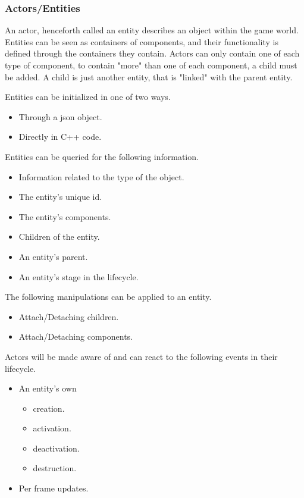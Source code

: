\subsubsection*{Actors/Entities}
An actor, henceforth called an entity describes an object within the game world. 
Entities can be seen as containers of components, 
and their functionality is defined through the containers they contain.
Actors can only contain one of each type of component, to contain "more" than one of each component, a child must be added. 
A child is just another entity, that is "linked" with the parent entity.

Entities can be initialized in one of two ways.
\begin{itemize}
    \item
    Through a json object.

    \item
    Directly in C++ code.
\end{itemize}

Entities can be queried for the following information.
\begin{itemize}
    \item
    Information related to the type of the object.

    \item
    The entity's unique id.

    \item
    The entity's components.

    \item
    Children of the entity.

    \item
    An entity's parent.

    \item
    An entity's stage in the lifecycle.
\end{itemize}

The following manipulations can be applied to an entity.
\begin{itemize}
    \item 
    Attach/Detaching children.

    \item
    Attach/Detaching components.
\end{itemize}

Actors will be made aware of and can react to the following events in their lifecycle.
\begin{itemize}
    \item
    An entity's own
    \begin{itemize}
        \item creation.
        \item activation.
        \item deactivation.
        \item destruction.
    \end{itemize}

    \item
    Per frame updates.
\end{itemize}
